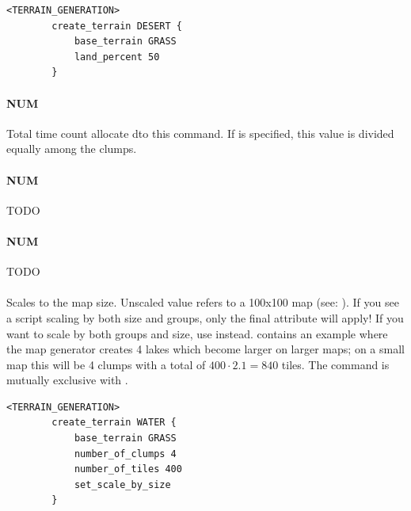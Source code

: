     \begin{lstlisting}[language={rms},label={lst:createterrain}]
        <TERRAIN_GENERATION>
        create_terrain DESERT {
            base_terrain GRASS
            land_percent 50
        }
    \end{lstlisting}

    \paragraph{ NUM}

    Total time count allocate dto this  command. If  is specified, this value is divided equally among the clumps.

    \paragraph{ NUM}

    TODO

    \paragraph{ NUM}

    TODO

    \paragraph{}

    Scales  to the map size. Unscaled value refers to a 100x100 map (see: ). If you see a script scaling by both size and groups, only the final attribute will apply! If you want to scale by both groups and size, use  instead.  contains an example where the map generator creates 4 lakes which become larger on larger maps; on a small map this will be 4 clumps with a total of $400 \cdot 2.1 = 840$ tiles. The command is mutually exclusive with .

    \begin{lstlisting}[language={rms},label={lst:setscalebysize}]
        <TERRAIN_GENERATION>
        create_terrain WATER {
            base_terrain GRASS
            number_of_clumps 4
            number_of_tiles 400
            set_scale_by_size
        }
    \end{lstlisting}

